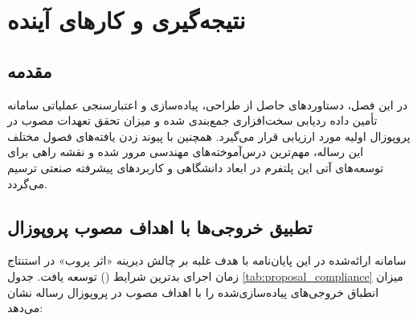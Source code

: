 
\chapter{نتیجه‌گیری و کارهای آینده}
\label{ch:conclusion}

\section{مقدمه}
در این فصل، دستاوردهای حاصل از طراحی، پیاده‌سازی و اعتبارسنجی عملیاتی سامانه تأمین داده ردیابی سخت‌افزاری جمع‌بندی شده و میزان تحقق تعهدات مصوب در پروپوزال اولیه مورد ارزیابی قرار می‌گیرد. همچنین با پیوند زدن یافته‌های فصول مختلف این رساله، مهم‌ترین درس‌آموخته‌های مهندسی مرور شده و نقشه راهی برای توسعه‌های آتی این پلتفرم در ابعاد دانشگاهی و کاربردهای پیشرفته صنعتی ترسیم می‌گردد.

\section{تطبیق خروجی‌ها با اهداف مصوب پروپوزال}
سامانه ارائه‌شده در این پایان‌نامه با هدف غلبه بر چالش دیرینه «اثر پروب» در استنتاج زمان اجرای بدترین شرایط () توسعه یافت. جدول \ref{tab:proposal_compliance} میزان انطباق خروجی‌های پیاده‌سازی‌شده را با اهداف مصوب در پروپوزال رساله نشان می‌دهد:

